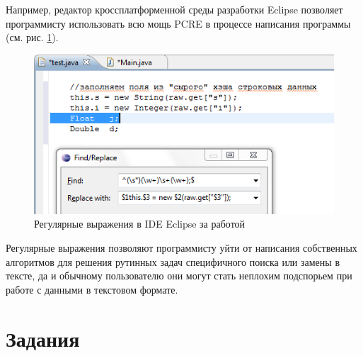 Например, редактор кроссплатформенной среды разработки Eclipse позволяет программисту использовать всю мощь PCRE в процессе написания программы (см. рис. \ref{fig:eclipseIde}).
\begin{figure}
    \centering
    \includegraphics{fig/eclipseIde}
    \caption{Регулярные выражения в IDE Eclipse за работой}\label{fig:eclipseIde}
\end{figure} 

Регулярные выражения позволяют программисту уйти от написания собственных алгоритмов для решения рутинных задач специфичного поиска или замены в тексте, да и обычному пользователю они могут стать неплохим подспорьем при работе с данными в текстовом формате.


\section*{Задания}

